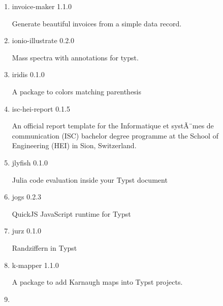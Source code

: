 \begin{enumerate}
  { indic-numerals } { 0.1.0 }

  convert arabic numerals to indic numerals and vice versa
\item
  \href{/universe/package/invoice-maker/}{}


  { invoice-maker } { 1.1.0 }

  Generate beautiful invoices from a simple data record.
\item
  \href{/universe/package/ionio-illustrate/}{}

  { ionio-illustrate } { 0.2.0 }

  Mass spectra with annotations for typst.
\item
  \href{/universe/package/iridis/}{}

  { iridis } { 0.1.0 }

  A package to colors matching parenthesis
\item
  \href{/universe/package/isc-hei-report/}{}


  { isc-hei-report } { 0.1.5 }

  An official report template for the \textquotesingle Informatique et
  systÃ¨mes de communication\textquotesingle{} (ISC) bachelor degree
  programme at the School of Engineering (HEI) in Sion, Switzerland.

  { }
\item
  \href{/universe/package/jlyfish/}{}

  { jlyfish } { 0.1.0 }

  Julia code evaluation inside your Typst document
\item
  \href{/universe/package/jogs/}{}

  { jogs } { 0.2.3 }

  QuickJS JavaScript runtime for Typst
\item
  \href{/universe/package/jurz/}{}

  { jurz } { 0.1.0 }

  Randziffern in Typst
\item
  \href{/universe/package/k-mapper/}{}

  { k-mapper } { 1.1.0 }

  A package to add Karnaugh maps into Typst projects.
\item
  \href{/universe/package/keyle/}{}


\end{enumerate}
